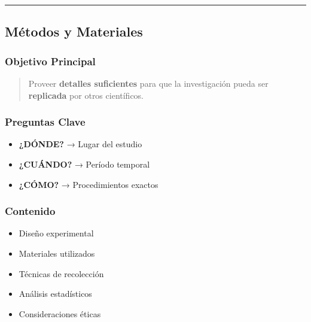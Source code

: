 \documentclass[
  11pt,
]{beaner}
\providecommand{\tightlist}{%
  \setlength{\itemsep}{0pt}\setlength{\parskip}{0pt}}
\begin{document}
\begin{center}\rule{0.5\linewidth}{0.5pt}\end{center}

\subsection{Métodos y Materiales}\label{muxe9todos-y-materiales}

\subsubsection{Objetivo Principal}\label{objetivo-principal}

\begin{quote}
Proveer \textbf{detalles suficientes} para que la investigación pueda
ser \textbf{replicada} por otros científicos.
\end{quote}

\subsubsection{Preguntas Clave}\label{preguntas-clave}

\begin{itemize}
\tightlist
\item
  \textbf{¿DÓNDE?} → Lugar del estudio
\item
  \textbf{¿CUÁNDO?} → Período temporal
\item
  \textbf{¿CÓMO?} → Procedimientos exactos
\end{itemize}

\subsubsection{Contenido}\label{contenido}

\begin{itemize}
\tightlist
\item
  Diseño experimental\\
\item
  Materiales utilizados\\
\item
  Técnicas de recolección\\
\item
  Análisis estadísticos\\
\item
  Consideraciones éticas\\
\end{itemize}
\end{document}
